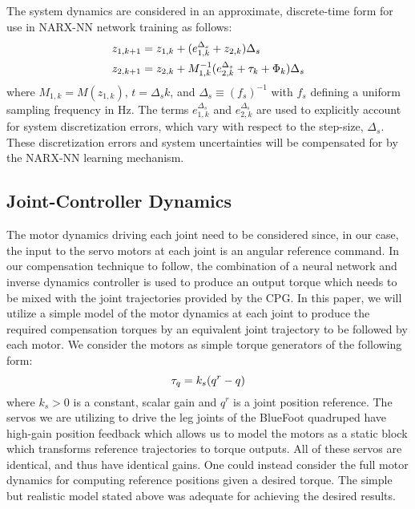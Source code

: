 The system dynamics are considered in an approximate, discrete-time form for use in NARX-NN network training as follows:
	\begin{equation}
		\vspace{-1.0mm}
		\begin{split}
		{z}_{1,k+1} &= {z}_{1,k} + ( {e}_{1,k}^{\Delta_{s}} + {z}_{2,k} )\Delta_{s} \\
		{z}_{2,k+1} &= {z}_{2,k} + M^{-1}_{1,k}( {e}_{2,k}^{\Delta_{s}} + \tau_{k} + \Phi_{k}) \Delta_{s} \\
		\end{split}
		\label{eq::sampled_dynamics}
	\end{equation}
where $M_{1,k} = M(z_{1,k})$, $t = \Delta_{s} k$, and $\Delta_{s} \equiv (f_{s})^{-1}$ with $f_{s}$ defining a uniform sampling frequency in Hz. The terms ${e}_{1,k}^{\Delta_{s}}$ and ${e}_{2,k}^{\Delta_{s}}$ are used to explicitly account for system discretization errors, which vary with respect to the step-size, $\Delta_{s}$. These discretization errors and system uncertainties will be compensated for by the NARX-NN learning mechanism.


\subsection{Joint-Controller Dynamics}
%
%
The motor dynamics driving each joint need to be considered since, in our case, the input to the servo motors at each joint is an angular reference command. In our compensation technique to follow, the combination of a neural network and inverse dynamics controller is used to produce an output torque which needs to be mixed  with the joint trajectories provided by the CPG. In this paper, we will utilize a simple model of the motor dynamics at each joint to produce the required compensation torques by an equivalent joint trajectory to be followed by each motor. We consider the motors as simple torque generators of the following form:
	\begin{equation}
		\vspace{-1mm}
		\tau_{q} = k_{s}(q^{r}-q)
		\label{eq::servo_control_dynamics}
	\end{equation}
where $k_{s}>0$ is a constant, scalar gain and $q^{r}$ is a joint position reference. The servos we are utilizing to drive the leg joints of the BlueFoot quadruped have high-gain position feedback which allows us to model the motors as a static block which transforms reference trajectories to torque outputs. All of these servos are identical, and thus have identical gains. One could instead consider the full motor dynamics for computing reference positions given a desired torque. The simple but realistic model stated above was adequate for achieving the desired results.